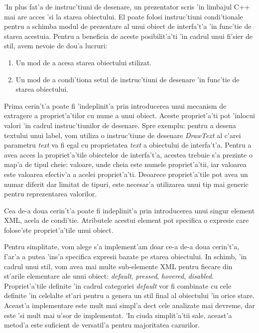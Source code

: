 'In plus fat'a de instruc'tiuni de desenare, un prezentator scris 'in limbajul C++ mai are acces 'si la starea obiectului. El poate folosi instruc'tiuni condi'tionale pentru a schimba modul de prezentare al unui obiect de interfa't'a 'in func'tie de starea acestuia. Pentru a beneficia de aceste posibilit'a'ti 'in cadrul unui fi'sier de stil, avem nevoie de dou'a lucruri:

\begin{enumerate}
\item Un mod de a acesa starea obiectului stilizat.
\item Un mod de a condi'tiona setul de instruc'tiuni de desenare 'in func'tie de starea obiectului.
\end{enumerate}

Prima cerin't'a poate fi 'indeplinit'a prin introducerea unui mecanism de extragere a propriet'a'tilor cu nume a unui obiect. Aceste propriet'a'ti pot 'inlocui valori 'in cadrul instruc'tiunilor de desenare. Spre exemplu: pentru a desena textului unui label, vom utiliza o instruc'tiune de desenare \emph{DrawText} al c'arei parametru \emph{text} va fi egal cu proprietatea \emph{text} a obiectului de interfa't'a. Pentru a avea acces la propriet'a'tile obiectelor de interfa't'a, acestea trebuie s'a prezinte o map'a de tipul cheie: valoare, unde cheia este numele propriet'a'tii, iar valoarea este valoarea efectiv'a a acelei propriet'a'ti. Deoarece propriet'a'tile pot avea un numar diferit dar limitat de tipuri, este necesar'a utilizarea unui tip mai generic pentru reprezentarea valorilor.

Cea de-a doua cerin't'a poate fi indeplinit'a prin introducerea unui singur element XML, acela de condi'tie. Atributele acestui element pot specifica o expresie care folose'ste propriet'a'tile unui obiect.

\medskip

Pentru simplitate, vom alege s'a implement'am doar ce-a de-a doua cerin't'a, f'ar'a a putea 'ins'a specifica expresii bazate pe starea obiectului. In schimb, 'in cadrul unui stil, vom avea mai multe sub-elemente XML pentru fiecare din st'arile elementare ale unui obiect: \emph{default}, \emph{pressed}, \emph{hovered}, \emph{disabled}. Propriet'a'tile definite 'in cadrul categoriei \emph{default} vor fi combinate cu cele definite 'in celelalte st'ari pentru a genera un stil final al obiectului 'in orice stare. Aceast'a implementare este mult mai simpl'a dec{\ia}t cele analizate mai devreme, dar este 'si mult mai u'sor de implementat. 'In ciuda simplit'a'tii sale, aceast'a metod'a este suficient de versatil'a pentru majoritatea cazurilor.

